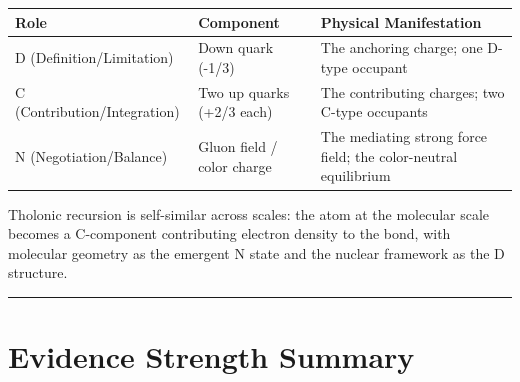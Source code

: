 \documentclass[12pt]{article}
\begin{document}
\begin{longtable}[]{@{}
  >{\raggedright\arraybackslash}p{}
  >{\raggedright\arraybackslash}p{}
  >{\raggedright\arraybackslash}p{}@{}}
\toprule\noalign{}
\begin{minipage}[b]{\linewidth}\raggedright
Role
\end{minipage} & \begin{minipage}[b]{\linewidth}\raggedright
Component
\end{minipage} & \begin{minipage}[b]{\linewidth}\raggedright
Physical Manifestation
\end{minipage} \\
\midrule\noalign{}
\endhead
\bottomrule\noalign{}
\endlastfoot
D (Definition/Limitation) & Down quark (-1/3) & The anchoring charge;
one D-type occupant \\
C (Contribution/Integration) & Two up quarks (+2/3 each) & The
contributing charges; two C-type occupants \\
N (Negotiation/Balance) & Gluon field / color charge & The mediating
strong force field; the color-neutral equilibrium \\
\end{longtable}

Tholonic recursion is self-similar across scales: the atom at the
molecular scale becomes a C-component contributing electron density to
the bond, with molecular geometry as the emergent N state and the
nuclear framework as the D structure.

\begin{center}\rule{0.5\linewidth}{0.5pt}\end{center}

\section{Evidence Strength Summary}\label{evidence-strength-summary}
\end{document}
